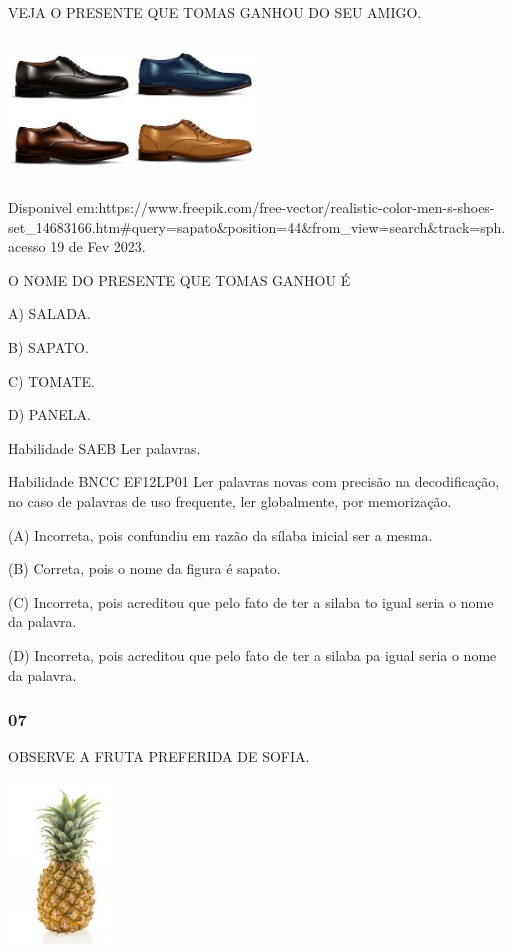 \begin{escola}
VEJA O PRESENTE QUE TOMAS GANHOU DO SEU AMIGO.

\includegraphics[width=2.60694in,height=1.48889in]{media/image191.jpg}

Disponivel
em:https://www.freepik.com/free-vector/realistic-color-men-s-shoes-set\_14683166.htm\#query=sapato\&position=44\&from\_view=search\&track=sph.acesso
19 de Fev 2023.

O NOME DO PRESENTE QUE TOMAS GANHOU É

A) SALADA.

B) SAPATO.

C) TOMATE.

D) PANELA.

Habilidade SAEB Ler palavras.

Habilidade BNCC EF12LP01 Ler palavras novas com precisão na
decodificação, no caso de palavras de uso frequente, ler globalmente,
por memorização.

(A) Incorreta, pois confundiu em razão da sílaba inicial ser a mesma.

(B) Correta, pois o nome da figura é sapato.

\protect\hypertarget{_heading=h.vx1227}{}{}
(C) Incorreta, pois acreditou que pelo fato de ter a silaba to igual seria o nome da palavra.

(D) Incorreta, pois acreditou que pelo fato de ter a silaba pa igual
seria o nome da
palavra.\protect\hypertarget{_heading=h.bdexdhbfzr3s}{}{}

\subsubsection{07}\label{section-32}

OBSERVE A FRUTA PREFERIDA DE SOFIA.

\includegraphics[width=1.15208in,height=1.72708in]{media/image192.jpg}


\end{escola}
